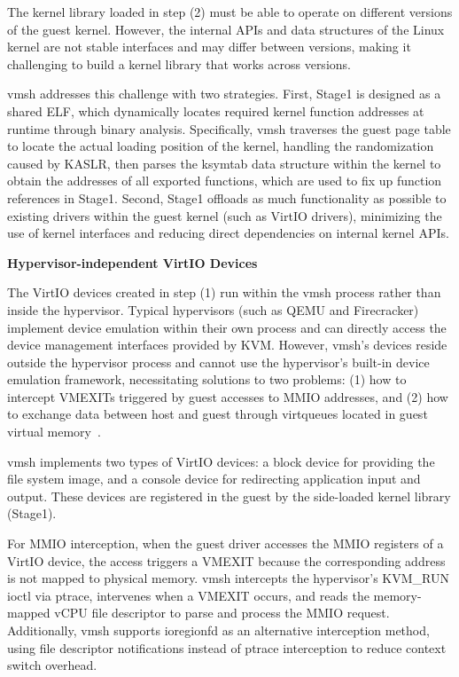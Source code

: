 \begin{ZhChapter}
The kernel library loaded in step (2) must be able to operate on different versions of the guest kernel. However, the internal APIs and data structures of the Linux kernel are not stable interfaces and may differ between versions, making it challenging to build a kernel library that works across versions.

vmsh addresses this challenge with two strategies. First, Stage1 is designed as a shared ELF, which dynamically locates required kernel function addresses at runtime through binary analysis. Specifically, vmsh traverses the guest page table to locate the actual loading position of the kernel, handling the randomization caused by KASLR, then parses the ksymtab data structure within the kernel to obtain the addresses of all exported functions, which are used to fix up function references in Stage1. Second, Stage1 offloads as much functionality as possible to existing drivers within the guest kernel (such as VirtIO drivers), minimizing the use of kernel interfaces and reducing direct dependencies on internal kernel APIs.

\noindent\textbf{Hypervisor-independent VirtIO Devices}

The VirtIO devices created in step (1) run within the vmsh process rather than inside the hypervisor. Typical hypervisors (such as QEMU and Firecracker) implement device emulation within their own process and can directly access the device management interfaces provided by KVM. However, vmsh's devices reside outside the hypervisor process and cannot use the hypervisor's built-in device emulation framework, necessitating solutions to two problems: (1) how to intercept VMEXITs triggered by guest accesses to MMIO addresses, and (2) how to exchange data between host and guest through virtqueues located in guest virtual memory~\cite{Thalheim2022}.

vmsh implements two types of VirtIO devices: a block device for providing the file system image, and a console device for redirecting application input and output. These devices are registered in the guest by the side-loaded kernel library (Stage1).

For MMIO interception, when the guest driver accesses the MMIO registers of a VirtIO device, the access triggers a VMEXIT because the corresponding address is not mapped to physical memory. vmsh intercepts the hypervisor's KVM\_RUN ioctl via ptrace, intervenes when a VMEXIT occurs, and reads the memory-mapped vCPU file descriptor to parse and process the MMIO request. Additionally, vmsh supports ioregionfd as an alternative interception method, using file descriptor notifications instead of ptrace interception to reduce context switch overhead.


\end{ZhChapter}

